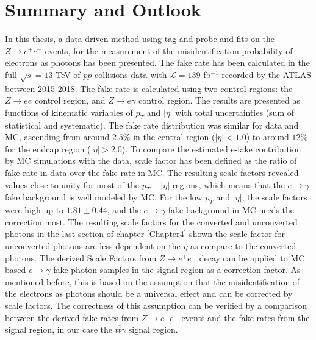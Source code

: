 
\chapter{Summary and Outlook} %

\label{Chapter5} %

In this thesis, a data driven method using tag and probe and fits on the $Z\rightarrow e^+e^-$ events, for the measurement of the misidentification probability of electrons as photons has been presented. The fake rate has been calculated in the full $\sqrt{s}=13$ TeV of $\textit{pp}$ collisions data with $\mathcal{L}=139$ fb$^{-1}$ recorded by the ATLAS between 2015-2018. The fake rate is calculated using two control regions: the $Z\rightarrow ee$ control region, and $Z\rightarrow e\gamma$ control region. The results are presented as functions of kinematic variables of $p_{T}$ and $|\eta|$ with total uncertainties (sum of statistical and systematic). The fake rate distribution was similar for data and MC, ascending from around $2.5\%$ in the central region ($|\eta|< 1.0$) to around $12\%$ for the endcap region ($|\eta|>2.0$). To compare the estimated e-fake contribution by MC simulations with the data, scale factor has been defined as the ratio of fake rate in data over the fake rate in MC. The resulting scale factors revealed values close to unity for most of the $p_{T} - |\eta|$ regions, which means that the $e\rightarrow\gamma$ fake background is well modeled by MC. For the low $p_T$ and $|\eta|$, the scale factors were high up to $1.81\pm0.44$, and the $e\rightarrow\gamma$ fake background in MC needs the correction most. The resulting scale factors for the converted and unconverted photons in the last section of chapter \ref{Chapter4} shown the scale factor for unconverted photons are less dependent on the $\eta$ as compare to the converted photons. The derived Scale Factors from $Z\rightarrow e^+e^-$ decay can be applied to MC based $e\rightarrow\gamma$ fake photon samples in the signal region as a correction factor. As mentioned before, this is based on the assumption that the misidentification of the electrons as photons should be a universal effect and can be corrected by scale factors. The correctness of this assumption can be verified by a comparison between the derived fake rates from $Z\rightarrow e^+e^-$ events and the fake rates from the signal region, in our case the $t\overline{t}\gamma$ signal region.
